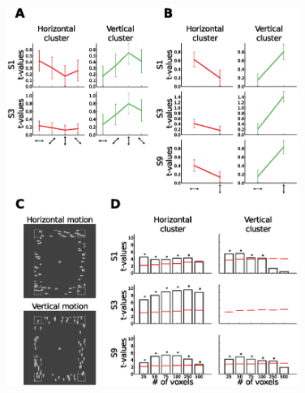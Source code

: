 \begin{figure}[htbp!]
\captionsetup{labelformat=empty}
\centering
\includegraphics[width=0.85\textwidth]{figures/chapter_03_SI/figS7.eps}
\caption{}
\end{figure}

